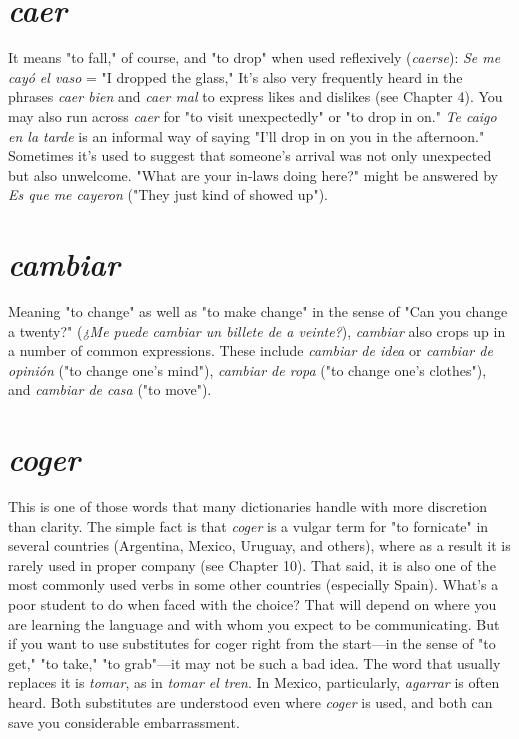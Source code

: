 \documentclass[14pt,a4paper,oneside]{memoir}
\begin{document}
\section{\emph{caer}}

It means "to fall," of course, and "to drop" when used reflexively (\emph{caerse}): \emph{Se me cayó el vaso} = "I dropped the glass," It's also
very frequently heard in the phrases \emph{caer bien} and \emph{caer mal} to express
likes and dislikes (see Chapter 4). You may also run across \emph{caer} for "to
visit unexpectedly" or "to drop in on." \emph{Te caigo en la tarde} is an informal way of saying "I'll drop in on you in the afternoon." Sometimes
it's used to suggest that someone's arrival was not only unexpected but
also unwelcome. "What are your in-laws doing here?" might be answered by \emph{Es que me cayeron} ("They just kind of showed up").

\section{\emph{cambiar}}

Meaning "to change" as well as "to make change" in the sense
of "Can you change a twenty?" (\emph{¿Me puede cambiar un billete de a
	veinte?}), \emph{cambiar} also crops up in a number of common expressions.
These include \emph{cambiar de idea} or \emph{cambiar de opinión} ("to change
one's mind"), \emph{cambiar de ropa} ("to change one's clothes"), and \emph{cambiar de casa} ("to move").

\section{\emph{coger}}

This is one of those words that many dictionaries handle with
more discretion than clarity. The simple fact is that \emph{coger} is a vulgar
term for "to fornicate" in several countries (Argentina, Mexico, Uruguay, and others), where as a result it is rarely used in proper company
(see Chapter 10). That said, it is also one of the most commonly used
verbs in some other countries (especially Spain). What's a poor student
to do when faced with the choice? That will depend on where you are
learning the language and with whom you expect to be communicating. But if you want to use substitutes for coger right from the start---in the sense of "to get," "to take," "to grab"---it may not be such a bad
idea. The word that usually replaces it is \emph{tomar}, as in \emph{tomar el tren}. In
Mexico, particularly, \emph{agarrar} is often heard. Both substitutes are
understood even where \emph{coger} is used, and both can save you considerable
embarrassment.
\end{document}
